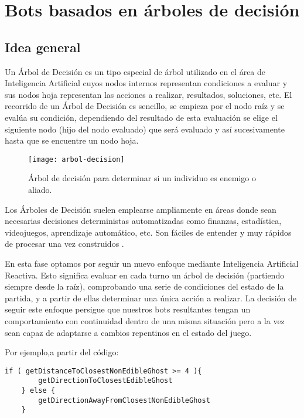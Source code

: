 \chapter{Bots basados en árboles de decisión} \label{cap:bots-arboles}

\section{Idea general}
Un Árbol de Decisión es un tipo especial de árbol utilizado en el área de Inteligencia Artificial cuyos nodos internos representan condiciones a evaluar y sus nodos hoja representan las acciones a realizar, resultados, soluciones, etc. El recorrido de un Árbol de Decisión es sencillo, se empieza por el nodo raíz y se evalúa su condición, dependiendo del resultado de esta evaluación se elige el siguiente nodo (hijo del nodo evaluado) que será evaluado y así sucesivamente hasta que se encuentre un nodo hoja.
\begin{figure}[H]
\centering
\texttt{[image: arbol-decision]}
\caption{Árbol de decisión para determinar si un individuo es enemigo o aliado.}
\end{figure}

Los Árboles de Decisión suelen emplearse ampliamente en áreas donde sean necesarias decisiones deterministas automatizadas como finanzas, estadística, videojuegos, aprendizaje automático, etc. Son fáciles de entender y muy rápidos de procesar una vez construidos \cite{aihorizonDecisiontrees}.

En esta fase optamos por seguir un nuevo enfoque mediante Inteligencia Artificial Reactiva. Esto significa evaluar en cada turno un árbol de decisión (partiendo siempre desde la raíz), comprobando una serie de condiciones del estado de la partida, y a partir de ellas determinar una única acción a realizar. La decisión de seguir este enfoque persigue que nuestros bots resultantes tengan un comportamiento con continuidad dentro de una misma situación pero a la vez sean capaz de adaptarse a cambios repentinos en el estado del juego. 
 
Por ejemplo,a partir del código:
\begin{lstlisting}[frame=single, breaklines=no, basicstyle=\fontsize{10}{11}\ttfamily]
    if ( getDistanceToClosestNonEdibleGhost >= 4 ){
        getDirectionToClosestEdibleGhost
    } else {
        getDirectionAwayFromClosestNonEdibleGhost
    }
\end{lstlisting}


